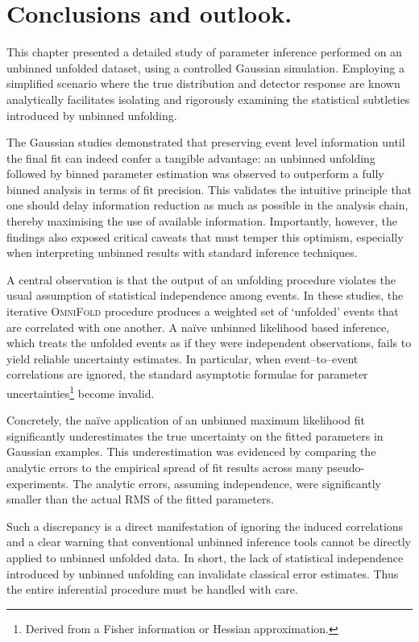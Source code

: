 \section{Conclusions and outlook.}
    This chapter presented a detailed study of parameter inference performed on an unbinned unfolded dataset, using a controlled Gaussian simulation.
    Employing a simplified scenario where the true distribution and detector response are known analytically facilitates isolating and rigorously examining the statistical subtleties introduced by unbinned unfolding.
    
    The Gaussian studies demonstrated that preserving event level information until the final fit can indeed confer a tangible advantage: an unbinned unfolding followed by binned parameter estimation was observed to outperform a fully binned analysis in terms of fit precision.
    This validates the intuitive principle that one should delay information reduction as much as possible in the analysis chain, thereby maximising the use of available information.
    Importantly, however, the findings also exposed critical caveats that must temper this optimism, especially when interpreting unbinned results with standard inference techniques.

    A central observation is that the output of an unfolding procedure violates the usual assumption of statistical independence among events.
    In these studies, the iterative \textsc{OmniFold} procedure produces a weighted set of `unfolded' events that are correlated with one another.
    A na\"ive unbinned likelihood based inference, which treats the unfolded events as if they were independent observations, fails to yield reliable uncertainty estimates.
    In particular, when event--to--event correlations are ignored, the standard asymptotic formulae for parameter uncertainties\footnote{Derived from a Fisher information or Hessian approximation.} become invalid.
    
    Concretely, the na\"ive application of an unbinned maximum likelihood fit significantly underestimates the true uncertainty on the fitted parameters in Gaussian examples.
    This underestimation was evidenced by comparing the analytic errors to the empirical spread of fit results across many pseudo-experiments.
    The analytic errors, assuming independence, were significantly smaller than the actual RMS of the fitted parameters.
    
    Such a discrepancy is a direct manifestation of ignoring the induced correlations and a clear warning that conventional unbinned inference tools cannot be directly applied to unbinned unfolded data.
    In short, the lack of statistical independence introduced by unbinned unfolding can invalidate classical error estimates.
    Thus the entire inferential procedure must be handled with care.

